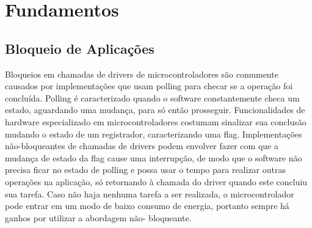 \documentclass[11pt]{article}
\begin{document}
\section{Fundamentos}
\subsection{Bloqueio de Aplicações}
\tab Bloqueios em chamadas de drivers de microcontroladores são comumente causados por implementações que usam polling para checar se a operação foi concluída. Polling é caracterizado
quando o software constantemente checa um estado, aguardando uma mudança, para só então
prosseguir. Funcionalidades de hardware especializado em microcontroladores costumam sinalizar sua
conclusão mudando o estado de um registrador, caracterizando uma flag. Implementações não-bloqueantes de chamadas de drivers podem envolver fazer com que a mudança de estado da flag cause
uma interrupção, de modo que o software não precisa ficar no estado de polling e possa usar o tempo
para realizar outras operações na aplicação, só retornando à chamada do driver quando este concluiu
sua tarefa. Caso não haja nenhuma tarefa a ser realizada, o microcontrolador pode entrar em um
modo de baixo consumo de energia, portanto sempre há ganhos por utilizar a abordagem não-
bloqueante.
\end{document}
